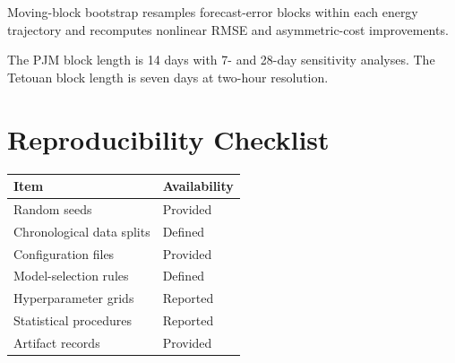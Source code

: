 \documentclass[12pt,draftclsnofoot,onecolumn]{IEEEtran}
\begin{document}
	Moving-block bootstrap resamples forecast-error blocks within each energy trajectory and recomputes nonlinear RMSE and asymmetric-cost improvements.
	
	The PJM block length is 14 days with 7- and 28-day sensitivity analyses. The Tetouan block length is seven days at two-hour resolution.
	
	
	\section{Reproducibility Checklist}
	
	\begin{table}[htbp]
		\centering
		\begin{tabular}{ll}
			\toprule
			Item & Availability\\
			\midrule
			Random seeds & Provided\\
			Chronological data splits & Defined\\
			Configuration files & Provided\\
			Model-selection rules & Defined\\
			Hyperparameter grids & Reported\\
			Statistical procedures & Reported\\
			Artifact records & Provided\\
			\bottomrule
		\end{tabular}
	\end{table}
	
	
\end{document}
